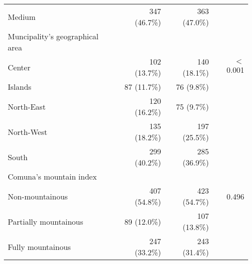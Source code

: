 \begin{table}[!h]
\begin{tabular}{llll}
\multicolumn{1}{l}{\hspace{1em}Medium} &
  \multicolumn{1}{r}{347 (46.7\%)} &
  \multicolumn{1}{r}{363 (47.0\%)} &
  \multicolumn{1}{r}{} \\
\multicolumn{1}{l}{Muncipality's geographical area} &
  \multicolumn{1}{r}{} &
  \multicolumn{1}{r}{} &
  \multicolumn{1}{r}{} \\
\multicolumn{1}{l}{\hspace{1em}Center} &
  \multicolumn{1}{r}{102 (13.7\%)} &
  \multicolumn{1}{r}{140 (18.1\%)} &
  \multicolumn{1}{r}{$<$0.001} \\
\multicolumn{1}{l}{\hspace{1em}Islands} &
  \multicolumn{1}{r}{87 (11.7\%)} &
  \multicolumn{1}{r}{76 (9.8\%)} &
  \multicolumn{1}{r}{} \\
\multicolumn{1}{l}{\hspace{1em}North-East} &
  \multicolumn{1}{r}{120 (16.2\%)} &
  \multicolumn{1}{r}{75 (9.7\%)} &
  \multicolumn{1}{r}{} \\
\multicolumn{1}{l}{\hspace{1em}North-West} &
  \multicolumn{1}{r}{135 (18.2\%)} &
  \multicolumn{1}{r}{197 (25.5\%)} &
  \multicolumn{1}{r}{} \\
\multicolumn{1}{l}{\hspace{1em}South} &
  \multicolumn{1}{r}{299 (40.2\%)} &
  \multicolumn{1}{r}{285 (36.9\%)} &
  \multicolumn{1}{r}{} \\
\multicolumn{1}{l}{Comuna's mountain index} &
  \multicolumn{1}{r}{} &
  \multicolumn{1}{r}{} &
  \multicolumn{1}{r}{} \\
\multicolumn{1}{l}{\hspace{1em}Non-mountainous} &
  \multicolumn{1}{r}{407 (54.8\%)} &
  \multicolumn{1}{r}{423 (54.7\%)} &
  \multicolumn{1}{r}{0.496} \\
\multicolumn{1}{l}{\hspace{1em}Partially mountainous} &
  \multicolumn{1}{r}{89 (12.0\%)} &
  \multicolumn{1}{r}{107 (13.8\%)} &
  \multicolumn{1}{r}{} \\
\multicolumn{1}{l}{\hspace{1em}Fully mountainous} &
  \multicolumn{1}{r}{247 (33.2\%)} &
  \multicolumn{1}{r}{243 (31.4\%)} &
  \multicolumn{1}{r}{} \\
\cline{1-4}
\end{tabular}
\end{table}
